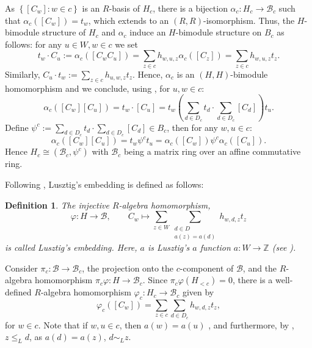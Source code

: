 \documentclass[oneside, a4paper, 11pt]{amsart}
\newcommand{\Z}{\mathbb{Z}}
\newcommand{\cB}{\mathcal{B}}
\newtheorem{definition}[theorem]{Definition }
\begin{document}
As $\left\{[C_w]: w\in c\right\}$ is an $R$-basis of $H_c$, there is a bijection $\alpha_c: H_c \longrightarrow {\cB}_c$ such that $\alpha_c([C_w])=t_w$, which extends to an $(R,R)$-isomorphism. Thus, the $H$-bimodule structure of $H_c$ and $\alpha_c$ induce an $H$-bimodule structure on $B_c$ as follows: for any  $u\in W, w\in c$ we set
\begin{equation}
 t_w\cdot C_u := \alpha_c([C_wC_u]) = \sum_{z\in c} h_{w,u,z} \alpha_c([C_z]) = \sum_{z\in c} h_{w,u,z} t_z.
\end{equation}
Similarly, $C_u\cdot t_w :=\sum_{z\in c} h_{u,w,z}t_z$.
Hence, $\alpha_c$ is an $(H,H)$-bimodule homomorphism and we conclude, using \cite[Lemma 5.5]{KXaffine}, for  $u, w\in c$:
\begin{equation}\label{eq:hecke-mult-cell}
\alpha_c([C_w][C_u]) 
= t_{w}\cdot[C_u]
= t_w\left(\sum_{d\in D_c} t_d \cdot \sum_{d\in D_c} [C_d]\right)t_u.
\end{equation}
Define $\psi^c := \sum_{d\in D_c} t_d \cdot \sum_{d\in D_c} [C_d]\in B_c$, then for any $w,u\in c$:
\begin{equation}\label{eq:mult-c-t}\alpha_c([C_w][C_u]) = t_w\psi^c t_u = \alpha_c([C_w])\psi^c \alpha_c([C_u]).\end{equation}
Hence $H_c\cong (\cB_c,\psi^c)$ with $\cB_c$ being a matrix ring over an affine commutative ring.

Following \cite{Xi}, Lusztig's embedding is defined as follows:

\begin{definition}
  The injective $R$-algebra homomorphism,
$$\varphi: H \to \cB, \qquad  C_w \mapsto  \sum_{z\in W} \sum_{\substack{d\in D\\ a(z)=a(d)}} h_{w,d,z}t_z$$
is called {\em Lusztig's embedding}.
Here, $a$ is Lusztig's $a$ function $a:W\to \Z$ (see \cite{Xi}).
\end{definition}

Consider $\pi_c:\cB \to {\cB}_c$,  the projection onto  the $c$-component of $\cB$, and the  $R$-algebra homomorphism $\pi_c\varphi: H\to {\cB}_c$. Since $\pi_c \varphi(H_{<c})=0$, there is a well-defined $R$-algebra homomorphism $\varphi_c: H_c \to  {\cB}_c$ given by \begin{equation}
\varphi_c\left([C_w]\right) =  \sum_{z\in c}\sum_{d\in D_c} h_{w,d,z}t_z,
\end{equation}
for $w\in c$.
Note that if $w,u\in c$, then $a(w)=a(u)$ \cite[Lemma 5.1]{KXaffine}, and furthermore, by  \cite[Lemma 5.1(3)]{KXaffine}, $z\leq_L d$, as $a(d)=a(z)$, $d{\mathtt{\sim}}_L z$.
\end{document}
